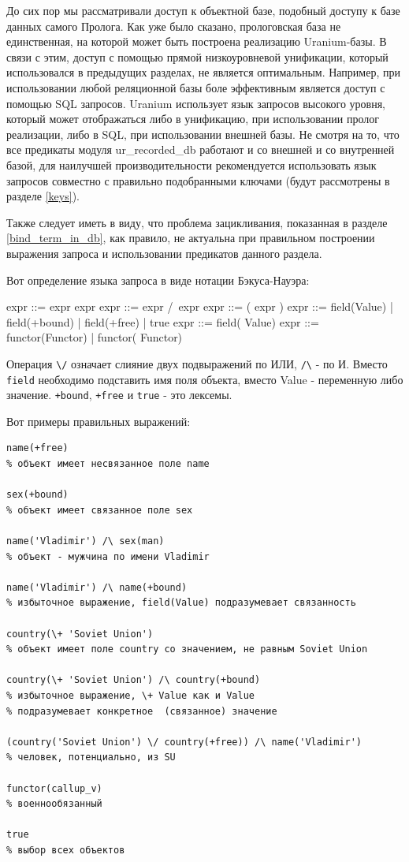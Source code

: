 \documentclass[a4paper]{book}
\def\ur{Uranium}
\begin{document}
До сих пор мы рассматривали доступ к объектной базе, подобный
доступу к базе данных самого Пролога. Как уже было сказано,
прологовская база не единственная, на которой может быть
построена реализацию \ur-базы. В связи с этим, доступ с помощью
прямой низкоуровневой унификации, который использовался в
предыдущих разделах, не является оптимальным. Например, при
использовании любой реляционной базы боле эффективным является
доступ с помощью SQL запросов. \ur{} использует язык запросов
высокого уровня, который может отображаться либо в унификацию,
при использовании пролог реализации, либо в SQL, при
использовании внешней базы. Не смотря на то, что все предикаты
модуля ur\_recorded\_db работают и со внешней и со внутренней
базой, для наилучшей производительности рекомендуется
использовать язык запросов совместно с правильно подобранными
ключами (будут рассмотрены в разделе \ref{keys}).

Также следует иметь в виду, что проблема зацикливания, показанная
в разделе \ref{bind_term_in_db}, как правило, не актуальна при
правильном построении выражения запроса и использовании
предикатов данного раздела.

Вот определение языка запроса в виде нотации Бэкуса-Науэра:

\begin{genexample}{}{}
expr ::= expr \/ expr
expr ::= expr /\ expr
expr ::= ( expr )
expr ::= field(Value) | field(+bound) | field(+free) | true
expr ::= field(\+ Value)
expr ::= functor(Functor) | functor(\+ Functor)
\end{genexample}
 
Операция \verb|\/| означает слияние двух подвыражений по ИЛИ,
\verb|/\| - по И. Вместо \verb|field| необходимо подставить имя
поля объекта, вместо Value - переменную либо
значение. \verb|+bound|, \verb|+free| и \verb|true| - это
лексемы.

Вот примеры правильных выражений:

\begin{verbatim}
name(+free)   
% объект имеет несвязанное поле name

sex(+bound)   
% объект имеет связанное поле sex

name('Vladimir') /\ sex(man) 
% объект - мужчина по имени Vladimir

name('Vladimir') /\ name(+bound) 
% избыточное выражение, field(Value) подразумевает связанность

country(\+ 'Soviet Union') 
% объект имеет поле country со значением, не равным Soviet Union

country(\+ 'Soviet Union') /\ country(+bound) 
% избыточное выражение, \+ Value как и Value 
% подразумевает конкретное  (связанное) значение

(country('Soviet Union') \/ country(+free)) /\ name('Vladimir') 
% человек, потенциально, из SU

functor(callup_v)
% военнообязанный

true
% выбор всех объектов
\end{verbatim}
\end{document}

